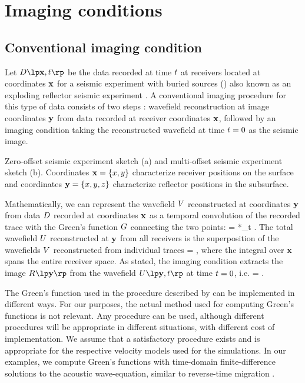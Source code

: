 \section{Imaging conditions}

\subsection{Conventional imaging condition}
Let $\DD{\xm,\tm}$ be the data recorded at time ${t}$ at receivers
located at coordinates ${\mathbf{x}}$ for a seismic experiment with buried
sources () also known as an exploding reflector seismic
experiment \cite[]{GPR24-02-03800399}. A conventional imaging
procedure for this type of data consists of two steps
\cite[]{Claerbout.iei}: wavefield reconstruction at image coordinates
${\mathbf{y}}$ from data recorded at receiver coordinates ${\mathbf{x}}$, followed by an
imaging condition taking the reconstructed wavefield at time ${t}=0$
as the seismic image.

 {Zero-offset
seismic experiment sketch (a) and multi-offset seismic experiment
sketch (b). Coordinates ${\mathbf{x}}=\{x,y\}$ characterize receiver positions
on the surface and coordinates ${\mathbf{y}}=\{x,y,z\}$ characterize reflector
positions in the subsurface.}

Mathematically, we can represent the wavefield $V$ reconstructed at
 coordinates ${\mathbf{y}}$ from data $D$ recorded at coordinates ${\mathbf{x}}$ as a
 temporal convolution of the recorded trace with the Green's function
 $G$ connecting the two points:
%
\beq \label{eqn:wrec}
\VV{\xm,\ym,\tm} = \DD{\xm,\tm} *_t \GG{\xm,\ym,\tm} \;.
\eeq
%
The total wavefield $U$ reconstructed at ${\mathbf{y}}$ from all receivers is
the superposition of the wavefields $V$ reconstructed from individual
traces
%
\beq \label{eqn:urec}
\UU{\ym,\tm} = \intxm \VV{\xm,\ym,\tm} \;,
\eeq
%
where the integral over ${\mathbf{x}}$ spans the entire receiver space. As
stated, the imaging condition extracts the image $\IA{}{\ym}$ from the
wavefield $\UU{\ym,\tm}$ at time ${t}=0$, i.e.
%
\beq \label{eqn:cic}
\IA{}{\ym} =  \;.
\eeq

The Green's function used in the procedure described by  can
be implemented in different ways. For our purposes, the actual method
used for computing Green's functions is not relevant. Any procedure
can be used, although different procedures will be appropriate in
different situations, with different cost of implementation. We assume
that a satisfactory procedure exists and is appropriate for the
respective velocity models used for the simulations. In our examples,
we compute Green's functions with time-domain finite-difference
solutions to the acoustic wave-equation, similar to reverse-time
migration \cite[]{GEO48-11-15141524}.

